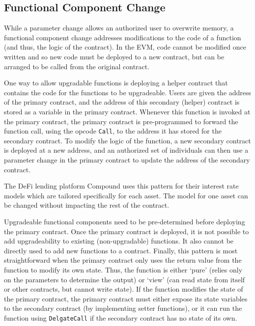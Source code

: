 
\subsection{Functional Component Change}
\label{sec:component}

While a parameter change allows an authorized user to overwrite memory, a functional component change addresses modifications to the code of a function (and thus, the logic of the contract). In the EVM, code cannot be modified once written and so new code must be deployed to a new contract, but can be arranged to be called from the original contract. 

One way to allow upgradable functions is deploying a helper contract that contains the code for the functions to be upgradeable. Users are given the address of the primary contract, and the address of this secondary (helper) contract is stored as a variable in the primary contract. Whenever this function is invoked at the primary contract, the primary contract is pre-programmed to forward the function call, using the opcode \texttt{Call}, to the address it has stored for the secondary contract. To modify the logic of the function, a new secondary contract is deployed at a new address, and an authorized set of individuals can then use a parameter change in the primary contract to update the address of the secondary contract.

The DeFi lending platform Compound uses this pattern for their interest rate models which are tailored specifically for each asset. The model for one asset can be changed without impacting the rest of the contract.

Upgradeable functional components need to be pre-determined before deploying the primary contract. Once the primary contract is deployed, it is not possible to add upgradeability to existing (non-upgradable) functions. It also cannot be directly used to add new functions to a contract. Finally, this pattern is most straightforward when the primary contract only uses the return value from the function to modify its own state. Thus, the function is either `pure' (relies only on the parameters to determine the output) or `view' (can read state from itself or other contracts, but cannot write state). If the function modifies the state of the primary contract, the primary contract must either expose its state variables to the secondary contract (by implementing setter functions), or it can run the function using \texttt{DelgateCall} if the secondary contract has no state of its own. 

